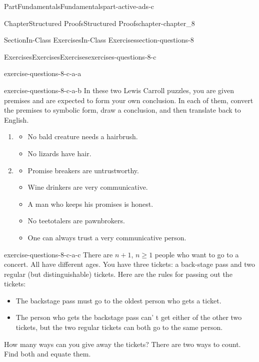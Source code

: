 \documentclass[oneside,10pt,]{book}
\numberwithin{equation}{section}
\begin{document}
\begin{partptx}{Part}{Fundamentals}{}{Fundamentals}{}{}{part-active-ads-c}
\begin{chapterptx}{Chapter}{Structured Proofs}{}{Structured Proofs}{}{}{chapter-chapter_8}
\begin{sectionptx}{Section}{In-Class Exercises}{}{In-Class Exercises}{}{}{section-questions-8}
\begin{exercises-subsection-numberless}{Exercises}{Exercises}{}{Exercises}{}{}{exercises-questions-8-c}
\begin{exercisegroup}
\begin{divisionexerciseeg}{1}{}{}{exercise-questions-8-c-a-a}
%
\end{divisionexerciseeg}%
\begin{divisionexerciseeg}{2}{}{}{exercise-questions-8-c-a-b}%
In these two Lewis Carroll puzzles, you are given premises and are expected to form your own conclusion.  In each of them, convert the premises to symbolic form, draw a conclusion, and then translate back to English.%
\begin{enumerate}[label=(\alph*)]
\item{}%
\begin{itemize}[label=\textbullet]
\item{}No bald creature needs a hairbrush.%
\item{}No lizards have hair.%
\end{itemize}
%
\item{}%
\begin{itemize}[label=\textbullet]
\item{}Promise breakers are untrustworthy.%
\item{}Wine drinkers are very communicative.%
\item{}A man who keeps his promises is honest.%
\item{}No teetotalers are pawnbrokers.%
\item{}One can always trust a very communicative person.%
\end{itemize}
%
\end{enumerate}
%
\end{divisionexerciseeg}%
\begin{divisionexerciseeg}{3}{}{}{exercise-questions-8-c-a-c}%
There are \(n+1\), \(n\ge 1\) people who want to go to a concert.  All have different ages. You have three tickets: a back-stage pass and two regular (but distinguishable) tickets. Here are the rules for passing out the tickets:%
\begin{itemize}[label=\textbullet]
\item{}The backstage pass must go to the oldest person who gets a ticket.%
\item{}The person who gets the backstage pass can' t get either of the other two tickets, but the two regular tickets can both go to the same person.%
\end{itemize}
How many ways can you give away the tickets? There are two ways to count. Find both and equate them.%
\end{divisionexerciseeg}%
\end{exercisegroup}
\par\medskip\noindent
\end{exercises-subsection-numberless}

\end{sectionptx}
\end{chapterptx}
\end{partptx}
\end{document}
